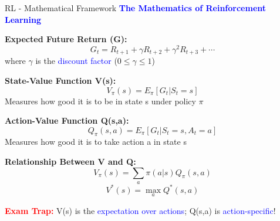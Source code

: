 \documentclass[8pt]{beamer}
\begin{document}
	\begin{frame}{RL - Mathematical Framework}
		\fontsize{6.5}{7.5}\selectfont
		\textcolor{blue}{\textbf{The Mathematics of Reinforcement Learning}}
		
		\textbf{Expected Future Return (G):}
		\[
		G_t = R_{t+1} + \gamma R_{t+2} + \gamma^2 R_{t+3} + \cdots
		\]
		where $\gamma$ is the \textcolor{blue}{discount factor} ($0 \leq \gamma \leq 1$)
		
		\textbf{State-Value Function V(s):}
		\[
		V_\pi(s) = E_\pi[G_t | S_t = s]
		\]
		Measures how good it is to be in state s under policy $\pi$
		
		\textbf{Action-Value Function Q(s,a):}
		\[
		Q_\pi(s,a) = E_\pi[G_t | S_t = s, A_t = a]
		\]
		Measures how good it is to take action a in state s
		
		\textbf{Relationship Between V and Q:}
		\[
		V_\pi(s) = \sum_a \pi(a|s) Q_\pi(s,a)
		\]
		\[
		V^*(s) = \max_a Q^*(s,a)
		\]
		
		\textcolor{red}{\textbf{Exam Trap:}} V(s) is the \textcolor{blue}{expectation over actions}; Q(s,a) is \textcolor{blue}{action-specific}!
	\end{frame}
	
\end{document}
